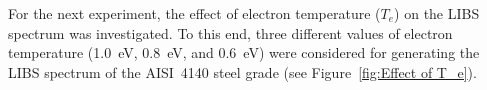 \documentclass[12pt,a4paper]{article}
\begin{document}
%
%
%
%
	For the next experiment, the effect of electron temperature ($T_e$) on the LIBS spectrum was investigated. To this end, three different values of electron temperature (1.0~eV, 0.8~eV, and 0.6~eV) were considered for generating the LIBS spectrum of the AISI~4140 steel grade (see Figure~\ref{fig:Effect of T_e}).  
	
\end{document}
